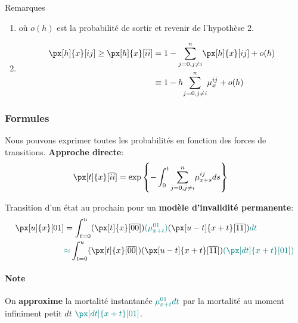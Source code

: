 \documentclass[10pt, french]{article}
\begin{document}
\begin{multicols*}{2}
\begin{conceptgen}{Remarques}
\begin{enumerate}[leftmargin = *]
	\item	{} où $o(h)$ est la probabilité de sortir et revenir de l'hypothèse 2.
	\item	
	\begin{align*}
		\px[h]{x}[ij] 
		\geq \px[h]{x}[\overline{ii}] 	
		&= 1 - \sumz{n}{j = 0, j \neq i} \px[h]{x}[ij] + o(h) 	\\
		&\equiv 1 - h \sumz{n}{j = 0, j \neq i} \mu_{x}^{ij} + o(h)
	\end{align*}
\end{enumerate}
\end{conceptgen}

\columnbreak
\subsubsection*{Formules}
Nous pouvons exprimer toutes les probabilités en fonction des forces de transitions. 
\textbf{Approche directe}:
\begin{align*}
	\px[t]{x}[\overline{ii}]
	&=	\text{exp}\left\{	-\int_{0}^{t}\sumz{n}{j = 0, j \neq i} \mu_{x + s}^{ij} ds\right\}
\end{align*}

Transition d'un état au prochain pour un \textbf{modèle d'invalidité permanente}:
\begin{align*}
	\px[u]{x}[01] 
	&=	\int_{t = 0}^{u} (\px[t]{x}[\overline{00}]) \textcolor{teal}{(\mu_{x + t}^{01})} (\px[u - t]{x + t}[\overline{11}]) \textcolor{teal}{dt}	\\
	&{\color{teal}\approx}	\int_{t = 0}^{u} (\px[t]{x}[\overline{00}]) (\px[u - t]{x + t}[\overline{11}]) \textcolor{teal}{(\px[dt]{x + t}[01])}
\end{align*}
\paragraph{Note}	On \textbf{\color{teal}approxime} la mortalité instantanée $\color{teal}\mu_{x + t}^{01}dt$ par la mortalité au moment infiniment petit $dt$ $\color{teal}\px[dt]{x + t}[01]$.\\


\end{multicols*}
\end{document}
